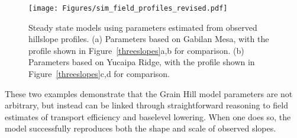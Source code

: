 \documentclass[esurf, manuscript]{copernicus}
\begin{document}
\begin{figure}[t]
\texttt{[image: Figures/sim\_field\_profiles\_revised.pdf]}
\caption{Steady state models using parameters estimated from observed hillslope profiles. (a) Parameters based on Gabilan Mesa, with the profile shown in Figure~\ref{threeslopes}a,b for comparison. (b) Parameters based on Yucaipa Ridge, with the profile shown in Figure~\ref{threeslopes}c,d for comparison.}
\label{simprofiles}
\end{figure}

These two examples demonstrate that the Grain Hill model parameters are not arbitrary, but instead can be linked through straightforward reasoning to field estimates of transport efficiency and baselevel lowering. When one does so, the model successfully reproduces both the shape and scale of observed slopes.

% 
%
%





\end{document}

